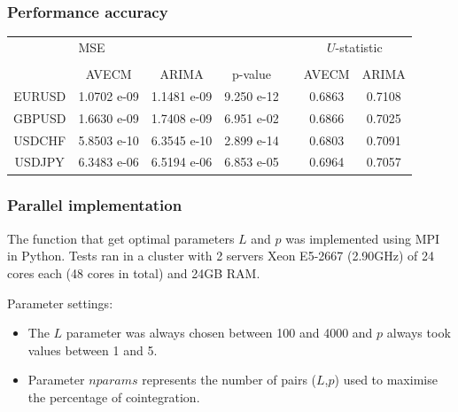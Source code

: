 \documentclass{beamer}
\begin{document}
\begin{frame}
\frametitle{Performance accuracy}
\small
\begin{tabular}{ccccccc}
& \multicolumn{3}{l}{MSE} & &
\multicolumn{2}{c}{$U$-statistic} \\ 
\hhline{~---~--} \\
 & AVECM & ARIMA & p-value & &
AVECM & ARIMA \\ 

\hline
 EURUSD & 1.0702 e-09 & 1.1481 e-09 &  9.250 e-12 & & 0.6863 & 0.7108\\
 GBPUSD & 1.6630 e-09 & 1.7408 e-09 &  6.951 e-02 & & 0.6866 & 0.7025\\
 USDCHF & 5.8503 e-10 & 6.3545 e-10 &  2.899 e-14 & & 0.6803 & 0.7091\\
 USDJPY  & 6.3483 e-06 & 6.5194 e-06 &  6.853 e-05 & & 0.6964 & 0.7057
 \end{tabular}
 \end{frame}
%
%
%
\begin{frame}
\frametitle{Parallel implementation}
The function that get optimal parameters $L$ and $p$ was implemented using MPI in Python. Tests ran in a cluster with 2 servers Xeon E5-2667 (2.90GHz) of 24 cores each (48 cores in total) and 24GB RAM.

Parameter settings:
\begin{itemize}
\item The $L$ parameter was always chosen between 100 and 4000 and $p$ always took values between 1 and 5. 
\item Parameter $nparams$ represents the number of pairs ($L$,$p$) used to maximise the percentage of cointegration. 
\end{itemize}
\end{frame}
\end{document}
